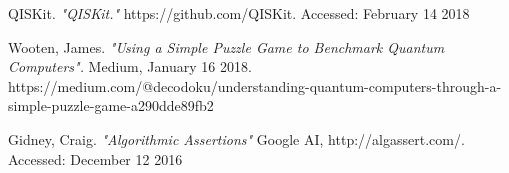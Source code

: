 \documentclass[a4paper]{article}
\begin{document}
\begin{thebibliography}{9}
	QISKit. \emph{"QISKit."} https://github.com/QISKit. Accessed: February 14 2018
 %

	Wooten, James. \emph{"Using a Simple Puzzle Game to Benchmark Quantum Computers".} Medium, January 16 2018. https://medium.com/@decodoku/understanding-quantum-computers-through-a-simple-puzzle-game-a290dde89fb2

%

	Gidney, Craig. \emph{"Algorithmic Assertions"} Google AI, http://algassert.com/. Accessed: December 12 2016 
 %




\end{thebibliography}
\end{document}
